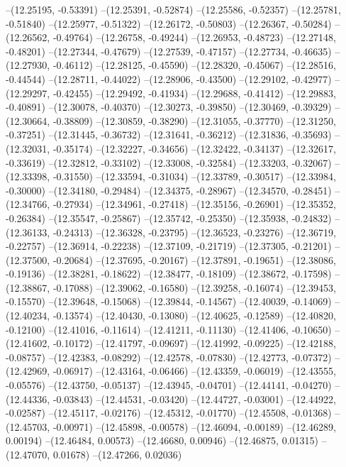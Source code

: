 --(12.25195, -0.53391)
--(12.25391, -0.52874)
--(12.25586, -0.52357)
--(12.25781, -0.51840)
--(12.25977, -0.51322)
--(12.26172, -0.50803)
--(12.26367, -0.50284)
--(12.26562, -0.49764)
--(12.26758, -0.49244)
--(12.26953, -0.48723)
--(12.27148, -0.48201)
--(12.27344, -0.47679)
--(12.27539, -0.47157)
--(12.27734, -0.46635)
--(12.27930, -0.46112)
--(12.28125, -0.45590)
--(12.28320, -0.45067)
--(12.28516, -0.44544)
--(12.28711, -0.44022)
--(12.28906, -0.43500)
--(12.29102, -0.42977)
--(12.29297, -0.42455)
--(12.29492, -0.41934)
--(12.29688, -0.41412)
--(12.29883, -0.40891)
--(12.30078, -0.40370)
--(12.30273, -0.39850)
--(12.30469, -0.39329)
--(12.30664, -0.38809)
--(12.30859, -0.38290)
--(12.31055, -0.37770)
--(12.31250, -0.37251)
--(12.31445, -0.36732)
--(12.31641, -0.36212)
--(12.31836, -0.35693)
--(12.32031, -0.35174)
--(12.32227, -0.34656)
--(12.32422, -0.34137)
--(12.32617, -0.33619)
--(12.32812, -0.33102)
--(12.33008, -0.32584)
--(12.33203, -0.32067)
--(12.33398, -0.31550)
--(12.33594, -0.31034)
--(12.33789, -0.30517)
--(12.33984, -0.30000)
--(12.34180, -0.29484)
--(12.34375, -0.28967)
--(12.34570, -0.28451)
--(12.34766, -0.27934)
--(12.34961, -0.27418)
--(12.35156, -0.26901)
--(12.35352, -0.26384)
--(12.35547, -0.25867)
--(12.35742, -0.25350)
--(12.35938, -0.24832)
--(12.36133, -0.24313)
--(12.36328, -0.23795)
--(12.36523, -0.23276)
--(12.36719, -0.22757)
--(12.36914, -0.22238)
--(12.37109, -0.21719)
--(12.37305, -0.21201)
--(12.37500, -0.20684)
--(12.37695, -0.20167)
--(12.37891, -0.19651)
--(12.38086, -0.19136)
--(12.38281, -0.18622)
--(12.38477, -0.18109)
--(12.38672, -0.17598)
--(12.38867, -0.17088)
--(12.39062, -0.16580)
--(12.39258, -0.16074)
--(12.39453, -0.15570)
--(12.39648, -0.15068)
--(12.39844, -0.14567)
--(12.40039, -0.14069)
--(12.40234, -0.13574)
--(12.40430, -0.13080)
--(12.40625, -0.12589)
--(12.40820, -0.12100)
--(12.41016, -0.11614)
--(12.41211, -0.11130)
--(12.41406, -0.10650)
--(12.41602, -0.10172)
--(12.41797, -0.09697)
--(12.41992, -0.09225)
--(12.42188, -0.08757)
--(12.42383, -0.08292)
--(12.42578, -0.07830)
--(12.42773, -0.07372)
--(12.42969, -0.06917)
--(12.43164, -0.06466)
--(12.43359, -0.06019)
--(12.43555, -0.05576)
--(12.43750, -0.05137)
--(12.43945, -0.04701)
--(12.44141, -0.04270)
--(12.44336, -0.03843)
--(12.44531, -0.03420)
--(12.44727, -0.03001)
--(12.44922, -0.02587)
--(12.45117, -0.02176)
--(12.45312, -0.01770)
--(12.45508, -0.01368)
--(12.45703, -0.00971)
--(12.45898, -0.00578)
--(12.46094, -0.00189)
--(12.46289, 0.00194)
--(12.46484, 0.00573)
--(12.46680, 0.00946)
--(12.46875, 0.01315)
--(12.47070, 0.01678)
--(12.47266, 0.02036)
